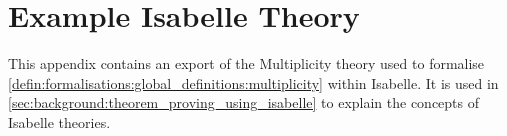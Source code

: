 \appendix
\chapter{Example Isabelle Theory}
\label{appendix:example_isabelle_theory}
This appendix contains an export of the Multiplicity theory used to formalise \cref{defin:formalisations:global_definitions:multiplicity} within Isabelle. It is used in \cref{sec:background:theorem_proving_using_isabelle} to explain the concepts of Isabelle theories.
\vspace{1em}
